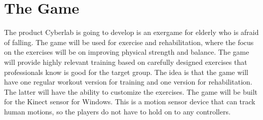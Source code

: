 \section{The Game}
The product Cyberlab is going to develop is an exergame for elderly who is afraid of falling. The game will be used for exercise and rehabilitation, where the focus on the exercises will be on improving physical strength and balance. The game will provide highly relevant training based on carefully designed exercises that professionals know is good for the target group. The idea is that the game will have one regular workout version for training and one version for rehabilitation. The latter will have the ability to customize the exercises. The game will be built for the Kinect sensor for Windows. This is a motion sensor device that can track human motions, so the players do not have to hold on to any controllers.

